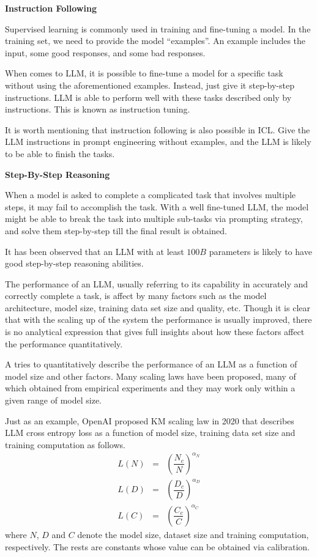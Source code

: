 \vspace{0.1in}
\noindent \textbf{Instruction Following}
\vspace{0.1in}

Supervised learning is commonly used in training and fine-tuning a model. In the training set, we need to provide the model ``examples''. An example includes the input, some good responses, and some bad responses. 

When comes to LLM, it is possible to fine-tune a model for a specific task without using the aforementioned examples. Instead, just give it step-by-step instructions. LLM is able to perform well with these tasks described only by instructions. This is known as instruction tuning.

It is worth mentioning that instruction following is also possible in ICL. Give the LLM instructions in prompt engineering without examples, and the LLM is likely to be able to finish the tasks.

\vspace{0.1in}
\noindent \textbf{Step-By-Step Reasoning}
\vspace{0.1in}

When a model is asked to complete a complicated task that involves multiple steps, it may fail to accomplish the task. With a well fine-tuned LLM, the model might be able to break the task into multiple sub-tasks via  prompting strategy, and solve them step-by-step till the final result is obtained.

It has been observed that an LLM with at least $100B$ parameters is likely to have good step-by-step reasoning abilities.

The performance of an LLM, usually referring to its capability in accurately and correctly complete a task, is affect by many factors such as the model architecture, model size, training data set size and quality, etc. Though it is clear that with the scaling up of the system the performance is usually improved, there is no analytical expression that gives full insights about how these factors affect the performance quantitatively.

A  tries to quantitatively describe the performance of an LLM as a function of model size and other factors. Many scaling laws have been proposed, many of which obtained from empirical experiments and they may work only within a given range of model size.

Just as an example, OpenAI proposed KM scaling law in 2020 that describes LLM cross entropy loss as a function of model size, training data set size and training computation as follows.
\begin{eqnarray}
	L(N) &=& \left(\dfrac{N_c}{N}\right)^{\alpha_N} \nonumber \\
	L(D) &=& \left(\dfrac{D_c}{D}\right)^{\alpha_D} \nonumber \\
	L(C) &=& \left(\dfrac{C_c}{C}\right)^{\alpha_C} \nonumber
\end{eqnarray}
where $N$, $D$ and $C$ denote the model size, dataset size and training computation, respectively. The rests are constants whose value can be obtained via calibration.

